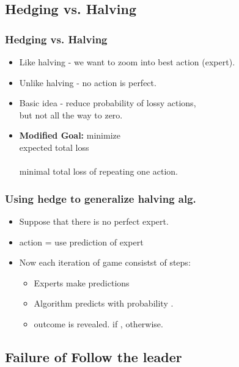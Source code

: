 \documentclass{beamer}
\begin{document}
\subsection{Hedging vs. Halving}

\begin{frame}
\frametitle{Hedging vs. Halving}
\begin{itemize}
\item Like halving - we want to zoom into best action (expert).
\item Unlike halving - no action is perfect.
\item Basic idea - reduce probability of lossy actions, \\
but {\color{blue}not all the way to zero}.
\item {\bf Modified Goal:}
minimize {\color{blue}{difference between}} \\
expected total loss \\
{\color{blue}{and}} \\
minimal total loss of repeating one action.
\R{\[
\sum_{t=1}^T \distvec{t} \cdot \costvec{t} - \min_i \left(\sum_{t=1}^T \cost{t}{i} \right)
\]}
\end{itemize}
\end{frame}

\begin{frame}
\frametitle{Using hedge to generalize halving alg.}
\begin{itemize}
\item Suppose that there is no perfect expert.
\item action  = use prediction of expert 
\item Now each iteration of game consistst of  steps:
\begin{itemize}
\item Experts make predictions 
\item Algorithm predicts  with probability .
\item outcome  is revealed.  if ,  otherwise.
\end{itemize}
\end{itemize}
\end{frame}

\subsection{Failure of Follow the leader}
\end{document}
